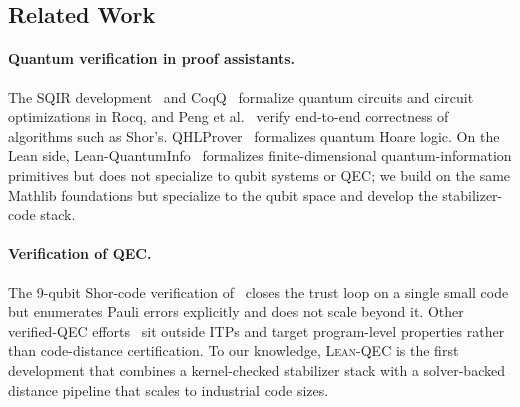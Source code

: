 \subsection{Related Work}\label{sec:related}

%
%

\paragraph{Quantum verification in proof assistants.} The SQIR
development~\cite{hietala2021} and CoqQ~\cite{coqq} formalize quantum circuits
and circuit optimizations in Rocq, and Peng et
al.~\cite{peng2022formallycertifiedendtoendimplementation} verify end-to-end
correctness of algorithms such as Shor's. QHLProver~\cite{liu2019} formalizes
quantum Hoare logic. On the Lean side,
Lean-QuantumInfo~\cite{meiburg2025formalization} formalizes finite-dimensional
quantum-information primitives but does not specialize to qubit systems or QEC;
we build on the same Mathlib foundations but specialize to the qubit space and
develop the stabilizer-code stack.

\paragraph{Verification of QEC.} The 9-qubit Shor-code verification
of~\cite{feng-9-qubits} closes the trust loop on a single small code but
enumerates Pauli errors explicitly and does not scale beyond it. Other
verified-QEC efforts~\cite{huang2025efficient, wu2021qecv} sit outside ITPs and
target program-level properties rather than code-distance certification. To our
knowledge, \textsc{Lean-QEC} is the first development that combines a
kernel-checked stabilizer stack with a solver-backed distance pipeline that
scales to industrial code sizes.

